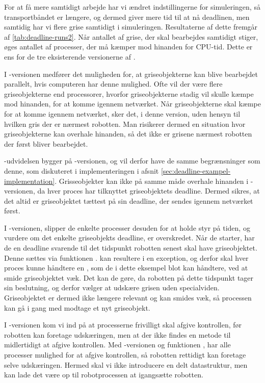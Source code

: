 For at få mere samtidigt arbejde har vi ændret indstillingerne for simuleringen, så transportbåndet er længere, og dermed giver mere tid til at nå deadlinen, men samtidig har vi flere grise samtidigt i simuleringen. Resultaterne af dette fremgår af \cref{tab:deadline-runs2}. Når antallet af grise, der skal bearbejdes samtidigt stiger, øges antallet af processer, der må kæmper mod hinanden for CPU-tid. Dette er ens for de tre eksisterende versionerne af \pycsp.  

I -versionen medfører det  muligheden for, at griseobjekterne kan blive  bearbejdet parallelt, hvis computeren har denne mulighed.  Ofte vil der være flere griseobjekterne end processorer, hvorfor griseobjekterne stadig vil skulle kæmpe mod hinanden, for at komme igennem netværket. Når griseobjekterne skal kæmpe for at komme igennem netværket, sker det, i denne version, uden hensyn til hvilken gris der er nærmest robotten. Man risikerer dermed en situation hvor griseobjekterne kan overhale hinanden, så det ikke er grisene nærmest robotten der først bliver bearbejdet.

-udvidelsen bygger på -versionen, og vil derfor have de samme begrænsninger som denne, som diskuteret i implementeringen i afsnit \cref{sec:deadline-exampel-implementation}. Grisseobjekter kan ikke  på samme måde overhale hinanden i -versionen, da hver proces har tilknyttet griseobjektets deadline. Dermed sikres, at det altid er griseobjektet tættest på sin deadline, der sendes igennem netværket først.

I -versionen, slipper de enkelte processer desuden for at holde styr på tiden, og vurdere om det enkelte griseobjekts deadline, er overskredet. Når de starter, har de en deadline svarende til det tidspunkt robotten senest skal have griseobjektet. Denne sættes via funktionen .  kan resultere i en exception, og derfor skal hver proces kunne håndtere en , som de i dette eksempel blot kan håndtere, ved at smide griseobjektet væk. Det kan de gøre, da robotten på dette tidspunkt tager sin beslutning, og derfor vælger at udskære grisen uden specialviden. Griseobjektet er dermed ikke længere relevant og kan smides væk, så processen kan gå i gang med modtage et nyt griseobjekt.

I -versionen kom vi ind på at processerne frivilligt skal afgive kontrollen, før robotten kan foretage udskæringen, men at der ikke findes en metode til midlertidigt at afgive kontrollen. Med -versionen og funktionen , har alle processer mulighed for at afgive kontrollen, så robotten rettidigt kan foretage selve udskæringen. Hermed skal vi ikke introducere en delt datastruktur, men kan lade det være op til robotprocessen at igangsætte robotten.
  
